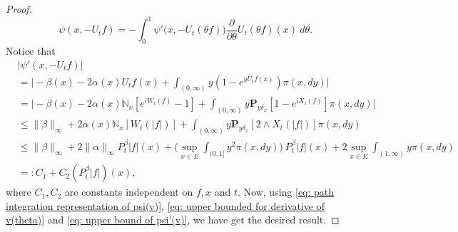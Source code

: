 \documentclass[12pt]{amsart}
\theoremstyle{plain}
\theoremstyle{definition}
\numberwithin{equation}{section}
\begin{document}
\begin{proof}
\begin{equation}
\label{eq: path integration representation of psi(v)}
    \psi(x,-U_tf) = -\int_0^1 \psi'\big(x,-U_t(\theta f)\big) \frac{\partial}{\partial \theta} U_t(\theta f)(x)~d\theta.
\end{equation}
    Notice that
\begin{equation}
\label{eq: upper bound of psi'(v)}
\begin{split}
    &|\psi'(x, -U_tf)|
    \\&= \Big| -\beta(x)- 2\alpha(x) U_tf(x)+ \int_{(0,\infty)} y (1- e^{y U_tf(x)} ) \pi(x,dy)\Big|
    \\&= \Big| - \beta(x)- 2\alpha(x)\mathbb N_x[e^{i W_{t}(f)} - 1]  + \int_{(0,\infty)} y \mathbf P_{y \delta_x}[1-e^{i X_{t}(f)}] \pi(x,dy) \Big|
\\ &\leq \|\beta\|_\infty + 2\alpha(x)\mathbb N_x[W_t(|f|)]+ \int_{(0,\infty)} y\mathbf P_{y\delta_x}[2\wedge X_t(|f|)] \pi(x,dy)
\\ &\leq \|\beta\|_\infty + 2\|\alpha\|_\infty  P^\beta_t |f|(x) + \Big(\sup_{x\in E}\int_{(0,1]}y^2 \pi(x,dy)\Big)~P^\beta_t |f|(x) + 2\sup_{x\in E}\int_{(1,\infty)} y \pi(x,dy)
\\ &=: C_1 + C_2(P^\beta_t |f|)(x),
\end{split}
\end{equation}
    where $C_1, C_2$ are constants independent on $f,x$ and $t$.
    Now, using \eqref{eq: path integration representation of psi(v)}, \eqref{eq: upper bounded for derivative of v(theta)} and \eqref{eq: upper bound of psi'(v)}, we have get the desired result.
\end{proof}
\end{document}
